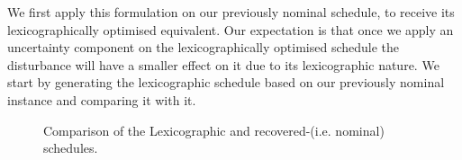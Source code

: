 \vspace{\baselineskip}
\noindent
We first apply this formulation on our previously nominal schedule, to receive its lexicographically optimised equivalent. Our expectation is that once we apply an uncertainty component on the lexicographically optimised schedule the disturbance will have a smaller effect on it due to its lexicographic nature. We start by generating the lexicographic schedule based on our previously nominal instance and comparing it with it.


\begin{figure}%
    \centering
    \qquad
    \centering
    \caption{Comparison of the Lexicographic and recovered-(i.e. nominal) schedules.}
    \label{fig: Nominal vs Lexicographic.}
\end{figure}

